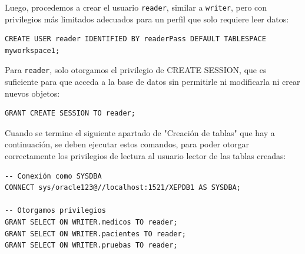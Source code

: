 \documentclass{article}
\begin{document}
Luego, procedemos a crear el usuario \texttt{reader}, similar a \texttt{writer}, pero con privilegios más limitados adecuados para un perfil que solo requiere leer datos:

\begin{lstlisting}[style=bashStyle]
CREATE USER reader IDENTIFIED BY readerPass DEFAULT TABLESPACE myworkspace1;
\end{lstlisting}

Para \texttt{reader}, solo otorgamos el privilegio de CREATE SESSION, que es suficiente para que acceda a la base de datos sin permitirle ni modificarla ni crear nuevos objetos:

\begin{lstlisting}[style=bashStyle]
GRANT CREATE SESSION TO reader;
\end{lstlisting}

Cuando se termine el siguiente apartado de "Creación de tablas" que hay a continuación, se deben ejecutar estos comandos, para poder otorgar correctamente los privilegios de lectura al usuario lector de las tablas creadas:

\begin{lstlisting}[style=bashStyle]
-- Conexión como SYSDBA
CONNECT sys/oracle123@//localhost:1521/XEPDB1 AS SYSDBA;

-- Otorgamos privilegios
GRANT SELECT ON WRITER.medicos TO reader;
GRANT SELECT ON WRITER.pacientes TO reader;
GRANT SELECT ON WRITER.pruebas TO reader;
\end{lstlisting}
\end{document}
